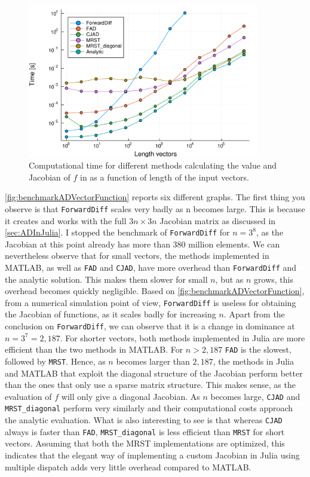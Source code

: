 \begin{figure}[H]
    \centering
    \includegraphics[width = 0.9\textwidth]{figures/benchmark_all_ADs.pdf}
    \caption{Computational time for different methods calculating the value and Jacobian of $f$ in  as a function of length of the input vectors.}
    \label{fig:benchmarkADVectorFunction}
\end{figure}
\autoref{fig:benchmarkADVectorFunction} reports six different graphs. The first thing you observe is that \texttt{ForwardDiff} scales very badly as n becomes large. This is because it creates and works with the full $3n \times 3n$ Jacobian matrix as discussed in \autoref{sec:ADInJulia}. I stopped the benchmark of \texttt{ForwardDiff} for $n = 3^8$, as the Jacobian at this point already has more than 380 million elements. We can nevertheless observe that for small vectors, the methods implemented in MATLAB, as well as \texttt{FAD} and \texttt{CJAD}, have more overhead than \texttt{ForwardDiff} and the analytic solution. This makes them slower for small $n$, but as $n$ grows, this overhead becomes quickly negligible. Based on \autoref{fig:benchmarkADVectorFunction}, from a numerical simulation point of view, \texttt{ForwardDiff} is useless for obtaining the Jacobian of functions, as it scales badly for increasing $n$.
Apart from the conclusion on \texttt{ForwardDiff}, we can observe that it is a change in dominance at $n = 3^7 = 2,187$. For shorter vectors, both methods implemented in Julia are more efficient than the two methods in MATLAB. For $n>2,187$ \texttt{FAD} is the slowest, followed by \texttt{MRST}. Hence, as $n$ becomes larger than $2,187$, the methods in Julia and MATLAB that exploit the diagonal structure of the Jacobian perform better than the ones that only use a sparse matrix structure. This makes sense, as the evaluation of $f$ will only give a diagonal Jacobian. As $n$ becomes large, \texttt{CJAD} and \texttt{MRST\_diagonal} perform very similarly and their computational costs approach the analytic evaluation. What is also interesting to see is that whereas \texttt{CJAD} always is faster than \texttt{FAD}, \texttt{MRST\_diagonal} is less efficient than \texttt{MRST} for short vectors. Assuming that both the MRST implementations are optimized, this indicates that the elegant way of implementing a custom Jacobian in Julia using multiple dispatch adds very little overhead compared to MATLAB. 

